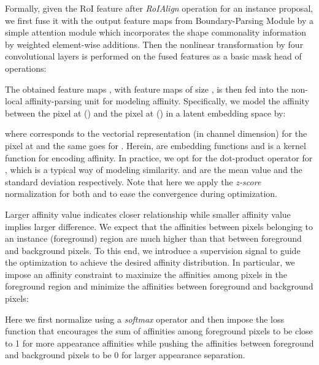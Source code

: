 \documentclass[runningheads]{llncs}
\begin{document}
Formally, given the RoI feature  after \emph{RoIAlign} operation for an instance proposal, we first fuse it with the output feature maps  from Boundary-Parsing Module by a simple attention module which incorporates the shape commonality information by weighted element-wise additions. Then the nonlinear transformation  by four convolutional layers is performed on the fused features as a basic mask head of operations:
\begin{small}

\end{small}

\vspace{-3mm}\noindent
The obtained feature maps , with  feature maps of size , is then fed into the non-local affinity-parsing unit for modeling affinity. 
Specifically, we model the affinity between the pixel at () and the pixel at () in a latent embedding space by:
\begin{small}

\end{small}

\vspace{-4mm}\noindent
where  corresponds to the vectorial representation (in channel dimension) for the pixel at  and the same goes for . Herein,  are embedding functions and  is a kernel function for encoding affinity. In practice, we opt for the dot-product operator for , which is a typical way of modeling similarity.  and  are the mean value and the standard deviation respectively. Note that here we apply the \emph{z-score} normalization for both  and  to ease the convergence during optimization. 


Larger affinity value indicates closer relationship while smaller affinity value implies larger difference. We expect that the affinities between pixels belonging to an instance (foreground) region are much higher than that between foreground and background pixels. To this end, we introduce a supervision signal to guide the optimization to achieve the desired affinity distribution. In particular, we impose an affinity constraint to maximize the affinities among pixels in the foreground region  and minimize the affinities between foreground  and background  pixels:
\begin{small}

\end{small}

\vspace{-2mm}\noindent
Here we first normalize  using a \emph{softmax} operator and then impose the loss function that encourages the sum of affinities among foreground pixels to be close to 1 for more appearance affinities while pushing the affinities between foreground and background pixels to be 0 for larger appearance separation.
\end{document}
